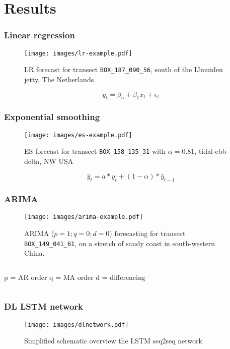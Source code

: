 \documentclass[10pt]{beamer}
\theoremstyle{remark}
\theoremstyle{definition}
\newcommand{\examplebox}[2]{
\begin{tcolorbox}[colframe=darkcardinal,colback=boxgray,title=#1]
#2
\end{tcolorbox}}
\begin{document}
\section{Results}

\begin{frame}
\frametitle{Linear regression}
	\begin{figure}
		\centering
		\texttt{[image: images/lr-example.pdf]}
		\caption{LR forecast for transect \texttt{BOX\_187\_090\_56}, south of the IJmuiden jetty, The Netherlands.}
		\label{fig:lr-example}
	\end{figure}
\examplebox{}{
\begin{equation}
\label{eq:lr}
y_t = \beta_o + \beta_1x_t + \epsilon_t
\end{equation}
}
\end{frame}

\begin{frame}
	\frametitle{Exponential smoothing}
	\begin{figure}
		\centering
		\texttt{[image: images/es-example.pdf]}
		\caption{ES forecast for transect \texttt{BOX\_158\_135\_31} with $\alpha = 0.81$, tidal-ebb delta, NW USA}
		\label{fig:es-example}
	\end{figure}

\examplebox{}{
\begin{equation}
\label{eq:es}
\hat{y}_t = a * y_t + (1 - \alpha) * \hat{y}_{t-1} 
\end{equation}
}
\end{frame}

\begin{frame}
	\frametitle{ARIMA}
	\begin{figure}
		\centering
		\texttt{[image: images/arima-example.pdf]}
		\caption{ARIMA ($p=1; q=0; d=0$) forecasting for transect \texttt{BOX\_149\_041\_61}, on a stretch of sandy coast in south-western China.}
		\label{fig:arima-example}
	\end{figure}

\examplebox{}{
	\begin{columns}
	p = AR order
	\column{0.3\textwidth}
	q = MA order
	\column{0.3\textwidth}
	d = differencing
	\end{columns}
}

\end{frame}

\begin{frame}
	\frametitle{DL LSTM network}
	\begin{figure}
		\centering
		\texttt{[image: images/dlnetwork.pdf]}
		\caption{Simplified schematic overview the LSTM seq2seq network}
		\label{fig:dlnetwork}
	\end{figure}
\end{frame}
\end{document}
